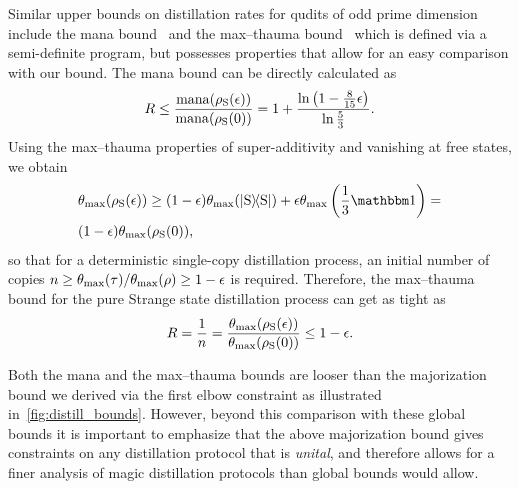 \documentclass[pra,
aps,
twocolumn,
superscriptaddress,
groupedaddress,
nofootinbib,
reprint
]{revtex4-1}
\begin{document}
Similar upper bounds on distillation rates for qudits of odd prime dimension include the mana bound~\cite{cit:veitch} and the max--thauma bound~\cite{Wang_2020} which is defined via a semi-definite program, but possesses properties that allow for an easy comparison with our bound.
The mana bound can be directly calculated as
\begin{equation}
	R \leq \frac{{{\rm{mana}}(\rho_{\rm{S}}(\epsilon))}}{{{\rm{mana}}(\rho_{\rm{S}}(0))}} = 1 + \frac{\ln \left(1 - \frac{8}{15}\epsilon \right)}{\ln \frac{5}{3}}.
\end{equation}
Using the max--thauma properties of super-additivity and vanishing at free states, we obtain
\begin{align}
	&\theta_{\rm{max}}(\rho_{\rm{S}}(\epsilon)) \geq (1-\epsilon) \theta_{\rm{max}}(\ketbra{\rm{S}}) + \epsilon \theta_{\rm{max}}\left(\frac{1}{3}\id \right) = \nonumber\\
	&(1-\epsilon) \theta_{\rm{max}}(\rho_{\rm{S}}(0)),
\end{align}
so that for a deterministic single-copy distillation process, an initial number of copies $n \geq \theta_{\rm{max}}(\tau) / \theta_{\rm{max}}(\rho) \geq 1-\epsilon$ is required.
Therefore, the max--thauma bound for the pure Strange state distillation process can get as tight as 
\begin{equation}
	R = \frac{1}{n} = \frac{\theta_{\rm{max}}(\rho_{\rm{S}}(\epsilon))}{\theta_{\rm{max}}(\rho_{\rm{S}}(0))} \leq 1-\epsilon.
\end{equation}

Both the mana and the max--thauma bounds are looser than the majorization bound we derived via the first elbow constraint as illustrated in~\cref{fig:distill_bounds}. However, beyond this comparison with these global bounds it is important to emphasize that the above majorization bound gives constraints on any distillation protocol that is \emph{unital}, and therefore allows for a finer analysis of magic distillation protocols than global bounds would allow. 
\end{document}
